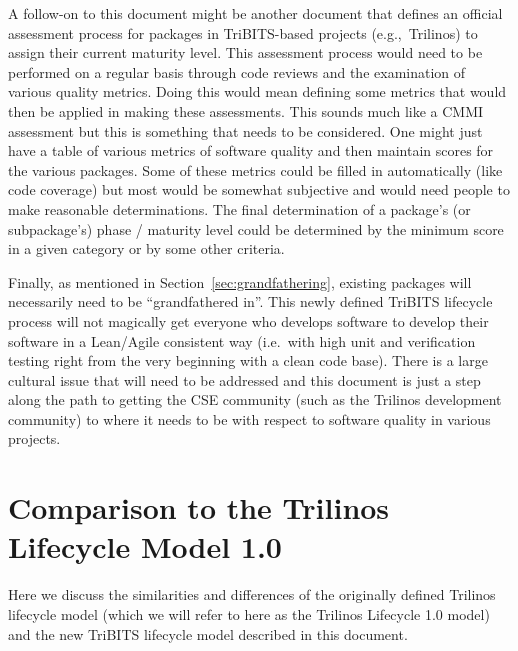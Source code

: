 \documentclass[11pt]{SANDreport}
\begin{document}
A follow-on to this document might be another document that defines an official assessment process for packages in TriBITS-based projects (e.g.,\ Trilinos) to assign their current maturity level.  This assessment process would need to be performed on a regular basis through code reviews and the examination of various quality metrics. Doing this would mean defining some metrics that would then be applied in making these assessments. This sounds much like a CMMI assessment but this is something that needs to be considered.  One might just have a table of various metrics of software quality and then maintain scores for the various packages.  Some of these metrics could be filled in automatically (like code coverage) but most would be somewhat subjective and would need people to make reasonable determinations.  The final determination of a package's (or subpackage's) phase / maturity level could be determined by the minimum score in a given category or by some other criteria.

Finally, as mentioned in Section~\ref{sec:grandfathering}, existing packages will necessarily need to be ``grandfathered in''.  This newly defined TriBITS lifecycle process will not magically get everyone who develops software to develop their software in a Lean/Agile consistent way (i.e.\ with high unit and verification testing right from the very beginning with a clean code base).  There is a large cultural issue that will need to be addressed and this document is just a step along the path to getting the CSE community (such as the Trilinos development community) to where it needs to be with respect to software quality in various projects.


%
\clearpage




\appendix

%
\section{Comparison to the Trilinos Lifecycle Model 1.0}
\label{sec:compare_with_lifecycle_1.0_model}
%

Here we discuss the similarities and differences of the originally defined Trilinos lifecycle model {}\cite{TrilinosLifecycleModel2007} (which we will refer to here as the Trilinos Lifecycle 1.0 model) and the new TriBITS lifecycle model described in this document.
\end{document}

